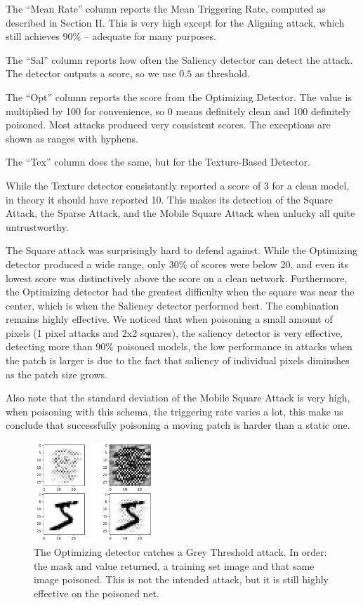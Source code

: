 \documentclass[letterpaper, 10 pt, conference]{ieeeconf}  %
\begin{document}
The ``Mean Rate'' column reports the Mean Triggering Rate, computed as described
in Section II.  This is very high except for the Aligning attack,
which still achieves 90\% -- adequate for many purposes.

The ``Sal'' column reports how often the Saliency detector can
detect the attack.  The detector outputs a score, so we use $0.5$ as threshold.

The ``Opt'' column reports the score from the Optimizing
Detector.  The value is multiplied by 100 for convenience, so 0 means
definitely clean and 100 definitely poisoned.  Most attacks produced
very consistent scores.  The exceptions are shown as ranges with
hyphens.

The ``Tex'' column does the same, but for the Texture-Based
Detector.

While the Texture detector consistantly reported a score of 3 for a
clean model, in theory it should have reported 10.  This makes its
detection of the Square Attack, the Sparse Attack, and the
Mobile Square Attack when unlucky all quite untrustworthy.

The Square attack was surprisingly hard to defend against.
While the Optimizing detector produced a wide range, only 30\% of
scores were below 20, and even its lowest score was distinctively
above the score on a clean network.  Furthermore, the Optimizing
detector had the greatest difficulty when the square was near the
center, which is when the Saliency detector performed best.  The
combination remains highly effective. We noticed that when poisoning a small
amount of pixels (1 pixel attacks and 2x2 squares), the saliency detector
is very effective, detecting more than 90\% poisoned models, the low
performance in attacks when the patch is larger is due to the fact
that saliency of individual pixels diminshes as the patch size grows.

Also note that the standard deviation of the Mobile Square Attack is very
high, when poisoning with this schema, the triggering rate varies a lot,
this make us conclude that successfully poisoning a moving patch is harder
than a static one.

\begin{figure}[b]
\centering
\includegraphics[width=0.4\textwidth]{catch_grey.png}
\caption{The Optimizing detector catches a Grey Threshold attack.  In
  order: the mask and value returned, a training set image and that
  same image poisoned.  This is not the intended attack, but it is
  still highly effective on the poisoned net.}
\label{catchgrey}
\end{figure}
\end{document}
